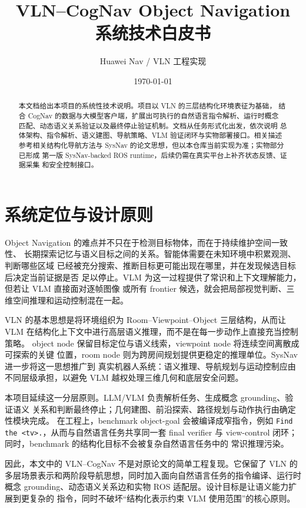 \documentclass[UTF8,zihao=-4]{ctexart}
\title{\bfseries VLN--CogNav Object Navigation 系统技术白皮书}
\author{Huawei Nav / VLN 工程实现}
\date{\today}
\begin{document}
\maketitle

\begin{abstract}
本文档给出本项目的系统性技术说明。项目以 VLN 的三层结构化环境表征为基础，
结合 CogNav 的数据与大模型客户端，扩展出可执行的自然语言指令解析、运行时概念
匹配、动态语义关系验证以及最终停止验证机制。文档从任务形式化出发，依次说明
总体架构、指令解析、语义建图、导航策略、VLM 验证闭环与实物部署接口。相关描述
参考相关结构化导航方法与 SysNav 的论文思想，但以本仓库当前实现为准；实物部分已形成
第一版 SysNav-backed ROS runtime，后续仍需在真实平台上补齐状态反馈、证据采集
和安全控制接口。
\end{abstract}

\tableofcontents
\newpage

\section{系统定位与设计原则}

Object Navigation 的难点并不只在于检测目标物体，而在于持续维护空间一致性、
长期探索记忆与语义目标之间的关系。智能体需要在未知环境中积累观测、判断哪些区域
已经被充分搜索、推断目标更可能出现在哪里，并在发现候选目标后决定当前证据是否
足以停止。VLM 为这一过程提供了常识和上下文理解能力，但若让 VLM 直接面对逐帧图像
或所有 frontier 候选，就会把局部视觉判断、三维空间推理和运动控制混在一起。

VLN 的基本思想是将环境组织为 Room--Viewpoint--Object 三层结构，从而让 VLM
在结构化上下文中进行高层语义推理，而不是在每一步动作上直接充当控制策略。
object node 保留目标定位与语义线索，viewpoint node 将连续空间离散成可探索的关键
位置，room node 则为跨房间规划提供更稳定的推理单位。SysNav 进一步将这一思想推广到
真实机器人系统：语义推理、导航规划与运动控制应由不同层级承担，以避免 VLM
越权处理三维几何和底层安全问题。

本项目延续这一分层原则。LLM/VLM 负责解析任务、生成概念 grounding、验证语义
关系和判断最终停止；几何建图、前沿探索、路径规划与动作执行由确定性模块完成。
在工程上，benchmark object-goal 会被编译成窄指令，例如
\texttt{Find the <tv>.}，从而与自然语言任务共享同一套 final verifier 与
view-control 闭环；同时，benchmark 的结构化目标不会被复杂自然语言任务中的
常识推理污染。

因此，本文中的 VLN--CogNav 不是对原论文的简单工程复现。它保留了 VLN 的
多层场景表示和两阶段导航思想，同时加入面向自然语言任务的指令编译、运行时概念
grounding、动态语义关系边和实物 ROS 适配层。设计目标是让语义能力扩展到更复杂的
指令，同时不破坏“结构化表示约束 VLM 使用范围”的核心原则。
\end{document}
